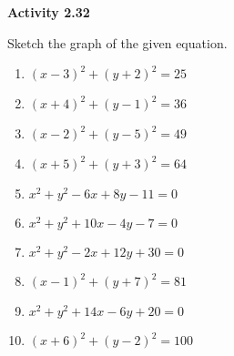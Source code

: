 \vspace{0.3ex}
\noindent\textbf{Activity 2.32}

\vspace{0.2ex}

Sketch the graph of the given equation.
\begin{multicols}{2}
\begin{enumerate}
    \item $(x - 3)^2 + (y + 2)^2 = 25$
    \item $(x + 4)^2 + (y - 1)^2 = 36$
    \item $(x - 2)^2 + (y - 5)^2 = 49$
    \item $(x + 5)^2 + (y + 3)^2 = 64$
    \item $x^2 + y^2 - 6x + 8y - 11 = 0$
    \item $x^2 + y^2 + 10x - 4y - 7 = 0$
    \item $x^2 + y^2 - 2x + 12y + 30 = 0$
    \item $(x - 1)^2 + (y + 7)^2 = 81$
    \item $x^2 + y^2 + 14x - 6y + 20 = 0$
    \item $(x + 6)^2 + (y - 2)^2 = 100$
\end{enumerate}
\end{multicols}
